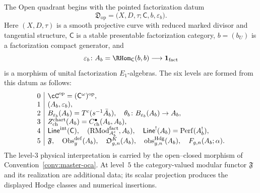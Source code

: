 \begin{convention}
\label{conv:master-primitive-datum}
The Open quadrant begins with the pointed factorization datum
\[
 \mathfrak D_{\mathrm{op}}
 =\bigl(X,D,\tau;\mathsf C,b,\varepsilon_b\bigr).
\]
Here $(X,D,\tau)$ is a smooth projective curve with reduced marked
divisor and tangential structure, $\mathsf C$ is a stable presentable
factorization category, $b=(b_U)$ is a factorization compact generator,
and
\[
 \varepsilon_b\colon
 A_b=\RHom_{\mathsf C}(b,b)\longrightarrow\mathbf1_{\mathrm{fact}}
\]
is a morphism of unital factorization $E_1$-algebras.  The six levels
are formed from this datum as follows:
\[
\begin{array}{c|l}
0 & \cC^{\mathrm{op}}=(\mathsf C^\omega)^{\mathrm{op}},\\
1 & (A_b,\varepsilon_b),\\
2 & B_{\varepsilon_b}(A_b)=T^c(s^{-1}\bar A_b),\quad
    \theta_b\colon B_{\varepsilon_b}(A_b)\to A_b,\\
3 & Z_{\mathrm{ch}}^{\mathrm{chart}}(A_b)
    =C^\bullet_{\mathrm{ch}}(A_b,A_b),\\
4 & \mathsf{Line}^{\mathrm{int}}(\mathsf C),\quad
    (\mathrm{RMod}^{\mathrm{fact}}_{A_b^e},A_b),\quad
    \mathsf{Line}^{!}(A_b)=\mathrm{Perf}(A_b^!),\\
5 & \mathfrak F,\quad
    \operatorname{Obs}^{\mathrm{def}}_g(A_b),\quad
    \mathfrak O^K_{g,n}(A_b),\quad
    \operatorname{obs}^{\mathrm{Hdg}}_{g,n}(A_b),\quad
    F_{g,n}(A_b;\alpha).
\end{array}
\]
The level-$3$ physical interpretation is carried by the open--closed
morphism of Convention~\ref{conv:master-oca}.  At level~$5$ the
category-valued modular functor $\mathfrak F$ and its realization are
additional data; its scalar projection produces the displayed Hodge
classes and numerical insertions.
\end{convention}

